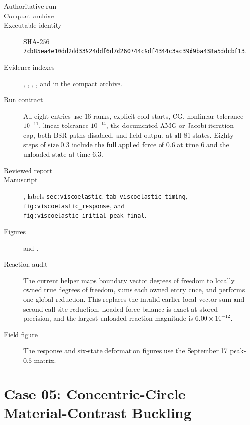 \documentclass[11pt]{article}
\newcommand{\sha}[2]{\texttt{#1}\allowbreak\texttt{#2}}
\begin{document}
\begin{description}
  \item[Authoritative run] 
  \item[Compact archive] 
  \item[Executable identity] SHA-256 \sha{7cb85ea4e10dd2dd33924ddf6d7d2607}{44c9df4344c3ac39d9ba438a5ddcbf13}.
  \item[Evidence indexes] , , , , and  in the compact archive.
  \item[Run contract] All eight entries use 16 ranks, explicit cold starts, CG, nonlinear tolerance $10^{-11}$, linear tolerance $10^{-14}$, the documented AMG or Jacobi iteration cap, both BSR paths disabled, and field output at all 81 states. Eighty steps of size 0.3 include the full applied force of 0.6 at time 6 and the unloaded state at time 6.3.
  \item[Reviewed report] 
  \item[Manuscript] , labels \texttt{sec:viscoelastic}, \texttt{tab:viscoelastic\_timing}, \texttt{fig:viscoelastic\_response}, and \texttt{fig:viscoelastic\_initial\_peak\_final}.
  \item[Figures]  and .
  \item[Reaction audit] The current helper maps boundary vector degrees of freedom to locally owned true degrees of freedom, sums each owned entry once, and performs one global reduction. This replaces the invalid earlier local-vector sum and second call-site reduction. Loaded force balance is exact at stored precision, and the largest unloaded reaction magnitude is $6.00\times10^{-12}$.
  \item[Field figure] The response and six-state deformation figures use the September 17 peak-0.6 matrix.
\end{description}

\section*{Case 05: Concentric-Circle Material-Contrast Buckling}
\end{document}
